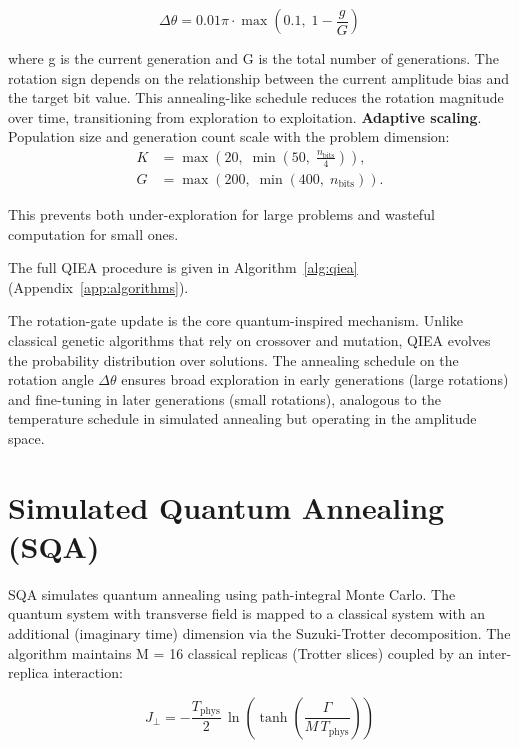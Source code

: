 \begin{equation}
\Delta \theta = 0.01 \pi \cdot \max\!\left(0.1,\; 1 - \frac{g}{G}\right)
\end{equation}

where g is the current generation and G is the total number of generations. The rotation sign depends on the relationship between the current amplitude bias and the target bit value. This annealing-like schedule reduces the rotation magnitude over time, transitioning from exploration to exploitation. \textbf{Adaptive scaling}. Population size and generation count scale with the problem dimension:
\begin{align}
K &= \max\!\left(20,\; \min\!\left(50,\; \frac{n_{\text{bits}}}{4}\right)\right), \\
G &= \max\!\left(200,\; \min\!\left(400,\; n_{\text{bits}}\right)\right).
\end{align}

This prevents both under-exploration for large problems and wasteful computation for small ones.

The full QIEA procedure is given in Algorithm~\ref{alg:qiea} (Appendix~\ref{app:algorithms}).

The rotation-gate update is the core quantum-inspired mechanism. Unlike classical genetic algorithms that rely on crossover and mutation, QIEA evolves the probability distribution over solutions. The annealing schedule on the rotation angle $\Delta\theta$ ensures broad exploration in early generations (large rotations) and fine-tuning in later generations (small rotations), analogous to the temperature schedule in simulated annealing but operating in the amplitude space.

\section{Simulated Quantum Annealing (SQA)}
SQA \cite{KadowakiNishimori1998} simulates quantum annealing using path-integral Monte Carlo. The quantum system with transverse field is mapped to a classical system with an additional (imaginary time) dimension via the Suzuki-Trotter decomposition. The algorithm maintains M = 16 classical replicas (Trotter slices) coupled by an inter-replica interaction:

\begin{equation}
J_{\perp} = -\frac{T_{\text{phys}}}{2} \, \ln\!\left( \tanh\!\left( \frac{\Gamma}{M \, T_{\text{phys}}} \right) \right)
\end{equation}

